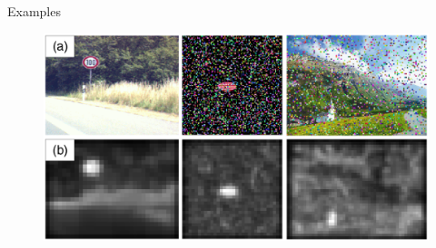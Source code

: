 \documentclass[xcolor=pdftex,dvipsnames,table,mathserif]{beamer}
\begin{document}


\begin{frame}{Examples \cite{itti_model_1998}}

\begin{figure}[ht]
  \centering
  \includegraphics[width=\textwidth]{saliency_maps_itti}
\end{figure}


\end{frame}




\end{document}

